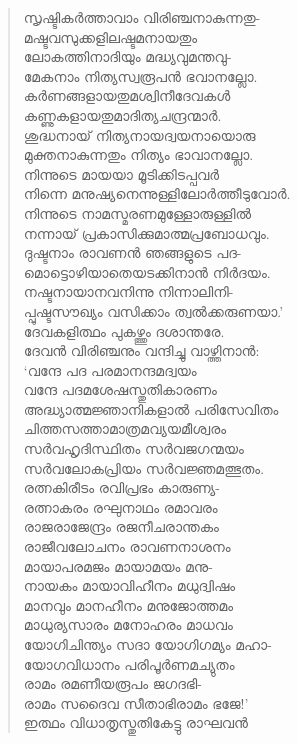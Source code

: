 \begin{verse}
സൃഷ്ടികര്‍ത്താവാം വിരിഞ്ചനാകുന്നതു-\\
മഷ്ടവസുക്കളിലഷ്ടമനായതും\\
ലോകത്തിനാദിയും മദ്ധ്യവുമന്തവു-\\
മേകനാം നിത്യസ്വരൂപന്‍ ഭവാനല്ലോ.\\
കര്‍ണങ്ങളായതുമശ്വിനീദേവകള്‍\\
കണ്ണുകളായതുമാദിത്യചന്ദ്രന്മാര്‍.\\
ശുദ്ധനായ് നിത്യനായദ്വയനായൊരു\\
മുക്തനാകുന്നതും നിത്യം ഭാവാനല്ലോ.\\
നിന്നുടെ മായയാ മൂടിക്കിടപ്പവര്‍\\
നിന്നെ മനുഷ്യനെന്നുള്ളിലോര്‍ത്തീടുവോര്‍.\\
നിന്നുടെ നാമസ്മരണമുള്ളോരുള്ളില്‍\\
നന്നായ് പ്രകാസിക്കുമാത്മപ്രബോധവും.\\
ദുഷ്ടനാം രാവണന്‍ ഞങ്ങളുടെ പദ-\\
മൊട്ടൊഴിയാതെയടക്കിനാന്‍ നിര്‍ദയം.\\
നഷ്ടനായാനവനിന്നു നിന്നാലിനി-\\
പ്പുഷ്ടസൗഖ്യം വസിക്കാം ത്വല്‍ക്കരുണയാ.’\\
ദേവകളിത്ഥം പുകഴ്ത്തും ദശാന്തരേ.\\
ദേവന്‍ വിരിഞ്ചനും വന്ദിച്ചു വാഴ്ത്തിനാന്‍:\\
‘വന്ദേ പദ പരമാനന്ദമദ്വയം\\
വന്ദേ പദമശേഷസ്തുതികാരണം\\
അദ്ധ്യാത്മജ്ഞാനികളാല്‍ പരിസേവിതം\\
ചിത്തസത്താമാത്രമവ്യയമീശ്വരം\\
സര്‍വഹൃദിസ്ഥിതം സര്‍വജഗന്മയം\\
സര്‍വലോകപ്രിയം സര്‍വജ്ഞമത്ഭുതം.\\
രത്നകിരീടം രവിപ്രഭം കാരുണ്യ-\\
രത്നാകരം രഘുനാഥം രമാവരം\\
രാജരാജേന്ദ്രം രജനീചരാന്തകം\\
രാജീവലോചനം രാവണനാശനം\\
മായാപരമജം മായാമയം മനു-\\
നായകം മായാവിഹീനം മധുദ്വിഷം\\
മാനവും മാനഹീനം മനുജോത്തമം\\
മാധുര്യസാരം മനോഹരം മാധവം\\
യോഗിചിന്ത്യം സദാ യോഗിഗമ്യം മഹാ-\\
യോഗവിധാനം പരിപൂര്‍ണമച്യുതം\\
രാമം രമണീയരൂപം ജഗദഭി-\\
രാമം സദൈവ സീതാഭിരാമം ഭജേ!’\\
ഇത്ഥം വിധാതൃസ്തുതികേട്ടു രാഘവന്‍\\

\end{verse}
